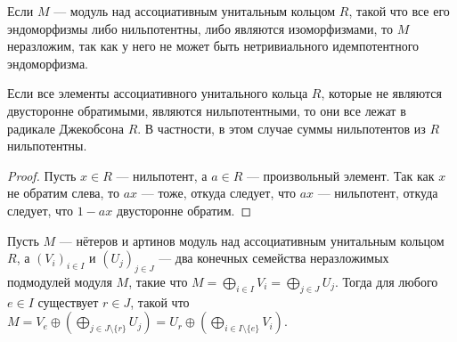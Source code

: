 \documentclass[
	extrafontsizes,
	11pt,
	hyphens,
]{memoir}
\begin{document}
\begin{remark}
Если \(M\) --- модуль над ассоциативным унитальным кольцом \(R\), такой что все его эндоморфизмы либо нильпотентны, либо являются изоморфизмами, то \(M\) неразложим, так как у него не может быть нетривиального идемпотентного эндоморфизма.
\end{remark}

%

\begin{lemma}
\label{lem:LocNilAb}
Если все элементы
ассоциативного унитального кольца
\(R\), которые не являются двусторонне обратимыми, являются нильпотентными, то они все лежат в радикале Джекобсона \(R\).
В частности, в этом случае суммы нильпотентов из \(R\) нильпотентны.
\end{lemma}

\begin{proof}
Пусть \(x \in R\) --- нильпотент, а \(a \in R\) --- произвольный элемент.
Так как \(x\) не обратим слева, то \(ax\) --- тоже, откуда следует, что \(ax\) --- нильпотент, откуда следует, что \(1 - ax\) двусторонне обратим.
\end{proof}

\begin{theorem}
Пусть \(M\) --- нётеров и артинов модуль над ассоциативным унитальным кольцом \(R\),
а \((V_i)_{i \in I}\) и \((U_j)_{j \in J}\)
--- два конечных семейства неразложимых подмодулей модуля \(M\), такие что \(M = \bigoplus_{i \in I} V_i = \bigoplus_{j \in J} U_j\).
Тогда для любого \(e \in I\) существует \(r \in J\), такой что \(M = V_e \oplus (\bigoplus_{j \in J \setminus \{r\}} U_j) = U_r \oplus (\bigoplus_{i \in I \setminus \{e\}} V_i)\).
\end{theorem}
\end{document}

